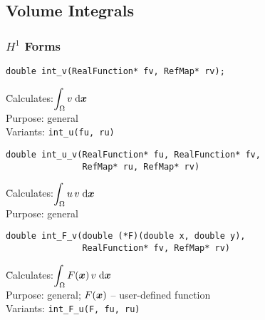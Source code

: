 
\subsection{Volume Integrals}
\label{sec:volint}

\subsubsection{$H^1$ Forms}


\newcommand{\info}[2]{
  \vspace{-4.5mm} 
  \begin{tabbing}
  \hspace{9mm} \= Calculates:\quad \= {#1} \\[1.5mm]
                \> Purpose:         \> {#2}
  \end{tabbing}
  \smallskip
}
\newcommand{\infov}[3]{
  \vspace{-4.5mm} 
  \begin{tabbing}
  \hspace{9mm} \= Calculates:\quad \= {#1} \\[1.5mm]
                \> Purpose:         \> {#2} \\[1mm]
                \> Variants:        \> #3
  \end{tabbing}
  \smallskip
}
\newcommand{\none}{\it none}
\newcommand{\volint}{\displaystyle\int_\Omega}
\newcommand{\dx}{\;\mbox{d}\bfx}
\newcommand{\var}{\tt\small}




\begin{lstlisting}
double int_v(RealFunction* fv, RefMap* rv);
\end{lstlisting}
\infov{$\volint v \dx$}
      {general}
      {\var int\_u(fu, ru)}



\begin{lstlisting}
double int_u_v(RealFunction* fu, RealFunction* fv,
               RefMap* ru, RefMap* rv)
\end{lstlisting}
\info{$\volint u\,v \dx$}
     {general}



\begin{lstlisting}
double int_F_v(double (*F)(double x, double y),
               RealFunction* fv, RefMap* rv)
\end{lstlisting}
\infov{$\volint F(\bfx)\,v \dx$}
      {general; $F(\mbox{\boldmath $x$})$ -- user-defined function}
      {\var int\_F\_u(F, fu, ru)}



